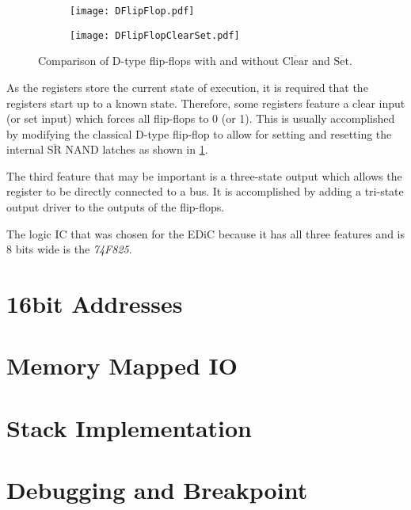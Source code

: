 \begin{figure}[t]
  \centering
  \begin{subfigure}[b]{.45\textwidth}
    \texttt{[image: DFlipFlop.pdf]}
  \end{subfigure}%
  \hspace{.05\textwidth}
  \begin{subfigure}[b]{.45\textwidth}
    \texttt{[image: DFlipFlopClearSet.pdf]}
  \end{subfigure}
  \caption{Comparison of D-type flip-flops with and without $\overline{\text{Clear}}$ and $\overline{\text{Set}}$.}
  \label{fig:clearSet}
\end{figure}
As the registers store the current state of execution, it is required that the registers start up to a known state.
Therefore, some registers feature a clear input (or set input) which forces all flip-flops to 0 (or 1).
This is usually accomplished by modifying the classical D-type flip-flop to allow for setting and resetting the internal $\overline{\text{SR}}$ NAND latches as shown in \cref{fig:clearSet}.

The third feature that may be important is a three-state output which allows the register to be directly connected to a bus.
It is accomplished by adding a tri-state output driver to the outputs of the flip-flops.

The logic \gls{IC} that was chosen for the \gls{EDiC} because it has all three features and is 8 bits wide is the \emph{74F825}.
\section{16bit Addresses}
\section{Memory Mapped IO}
\section{Stack Implementation}
\section{Debugging and Breakpoint}